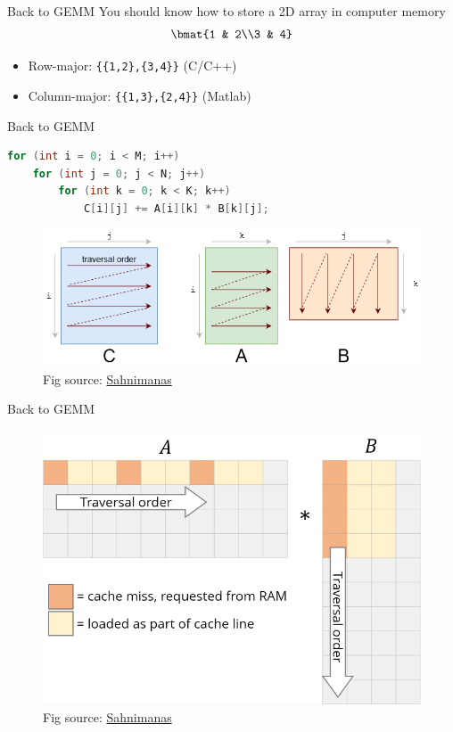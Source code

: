 \documentclass{../TexTemplate/myslide}
\begin{document}
\begin{frame}[fragile]{Back to GEMM}
You should know how to store a 2D array in computer memory
\[\bmat{1 & 2\\3 & 4}\]
\begin{itemize}
	\item Row-major: \verb'{{1,2},{3,4}}' (C/C++)
	\item Column-major: \verb'{{1,3},{2,4}}' (Matlab)
\end{itemize}
\end{frame}

\begin{frame}[fragile]{Back to GEMM}
\begin{lstlisting}[language=c++]
for (int i = 0; i < M; i++)
    for (int j = 0; j < N; j++)
        for (int k = 0; k < K; k++)
            C[i][j] += A[i][k] * B[k][j];
\end{lstlisting}
\begin{figure}
\centering
\includegraphics[width=0.8\linewidth]{fig/gemm.png}
\caption*{\scriptsize Fig source: \href{https://sahnimanas.github.io/post/anatomy-of-a-high-performance-convolution/img/naive-traversal.svg}{Sahnimanas}}
\end{figure}
\end{frame}

\begin{frame}{Back to GEMM}
\begin{figure}
\centering
\includegraphics[width=0.8\linewidth]{fig/cache-pollution.png}
\caption*{\scriptsize Fig source: \href{https://sahnimanas.github.io/post/anatomy-of-a-high-performance-convolution/img/cache-pollution.png}{Sahnimanas}}
\end{figure}
\end{frame}
\end{document}
